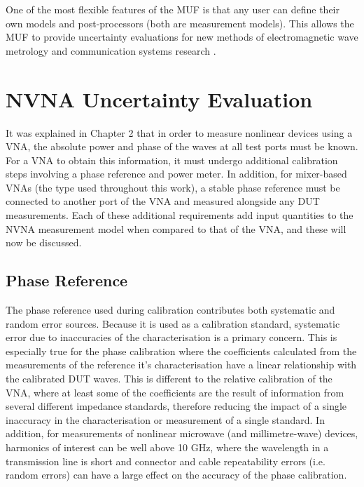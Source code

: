 \documentclass[../thesis/thesis.tex]{subfiles}
\begin{document}
\begin{refsection}
One of the most flexible features of the MUF is that any user can define their own models and post-processors (both are measurement models). This allows the MUF to provide uncertainty evaluations for new methods of electromagnetic wave metrology and communication systems research \cite{Dortmans_2019, Gu_2019}.

\section{NVNA Uncertainty Evaluation}

It was explained in Chapter 2 that in order to measure nonlinear devices using a VNA, the absolute power and phase of the waves at all test ports must be known. For a VNA to obtain this information, it must undergo additional calibration steps involving a phase reference and power meter. In addition, for mixer-based VNAs (the type used throughout this work), a stable phase reference must be connected to another port of the VNA and measured alongside any DUT measurements. Each of these additional requirements add input quantities to the NVNA measurement model when compared to that of the VNA, and these will now be discussed.

\subsection{Phase Reference}

The phase reference used during calibration contributes both systematic and random error sources. Because it is used as a calibration standard, systematic error due to inaccuracies of the characterisation is a primary concern. This is especially true for the phase calibration where the coefficients calculated from the measurements of the reference it's characterisation have a linear relationship with the calibrated DUT waves. This is different to the relative calibration of the VNA, where at least some of the coefficients are the result of information from several different impedance standards, therefore reducing the impact of a single inaccuracy in the characterisation or measurement of a single standard. In addition, for measurements of nonlinear microwave (and millimetre-wave) devices, harmonics of interest can be well above 10 GHz, where the wavelength in a transmission line is short and connector and cable repeatability errors (i.e. random errors) can have a large effect on the accuracy of the phase calibration.


\end{refsection}
\end{document}
